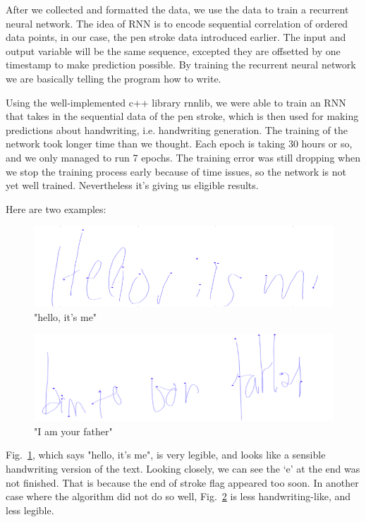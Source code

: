 \documentclass{article} %
\newcommand{\fref}[1]{Fig.~\ref{fig:#1}}
\newcommand{\flabel}[1]{\label{fig:#1}}
\begin{document}
After we collected and formatted the data, we use the data to train a recurrent neural network. The idea of RNN is to encode sequential correlation of ordered data points, in our case, the pen stroke data introduced earlier. The input and output variable will be the same sequence, excepted they are offsetted by one timestamp to make prediction possible. By training the recurrent neural network we are basically telling the program how to write. 

Using the well-implemented c++ library rnnlib, we were able to train an RNN that takes in the sequential data of the pen stroke, which is then used for making predictions about handwriting, i.e. handwriting generation. The training of the network took longer time than we thought. Each epoch is taking 30 hours or so, and we only managed to run 7 epochs. The training error was still dropping when we stop the training process early because of time issues, so the network is not yet well trained. Nevertheless it’s giving us eligible results. 

Here are two examples: 
\begin{figure}[h]
\begin{center}
\includegraphics[scale = 0.5]{hello.png}
\end{center}
\flabel{hello}
\caption{"hello, it's me"}
\end{figure}

\begin{figure}[h]
\begin{center}
\includegraphics[scale = 0.5]{father.png}
\end{center}
\flabel{father}
\caption{"I am your father"}
\end{figure}

\fref{hello}, which says "hello, it's me", is very legible, and looks like a sensible handwriting version of the text. Looking closely, we can see the ‘e’ at the end was not finished. That is because the end of stroke flag appeared too soon. In another case where the algorithm did not do so well, \fref{father} is less handwriting-like, and less legible.  
\end{document}
